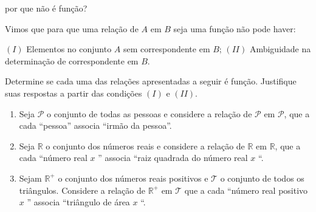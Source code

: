 \begin{task}{ por que não é função?}
\label{\detokenize{AF106-3:ativ-nao-funcao}}\label{\detokenize{AF106-3:atividade-por-que-nao-e-funcao}}

Vimos que para que uma relação de \(A\) em \(B\) seja uma função não pode haver:

\((I)\) Elementos no conjunto \(A\) sem correspondente em \(B\);
\((II)\) Ambiguidade na determinação de correspondente em \(B\).

Determine se cada uma das relações apresentadas a seguir é função. Justifique suas respostas a partir das condições \((I)\) e \((II)\).
\begin{enumerate}
\item {} 
Seja \(\mathcal{P}\) o conjunto de todas as pessoas e considere a relação de \(\mathcal{P}\) em \(\mathcal{P}\), que a cada “pessoa” associa “irmão da pessoa”.

\item {} 
Seja \(\mathbb{R}\)  o conjunto dos números reais e considere a relação de \(\mathbb{R}\) em \(\mathbb{R}\), que a cada “número real \(x\) ” associa “raiz quadrada do número real \(x\) “.

\item {} 
Sejam \(\mathbb{R}^+\) o conjunto dos números reais positivos e \(\mathcal{T}\) o conjunto de todos os triângulos. Considere a relação de \(\mathbb{R}^+\) em \(\mathcal{T}\) que a cada “número real positivo \(x\) ” associa “triângulo de área \(x\) “.

\end{enumerate}

\end{task}

